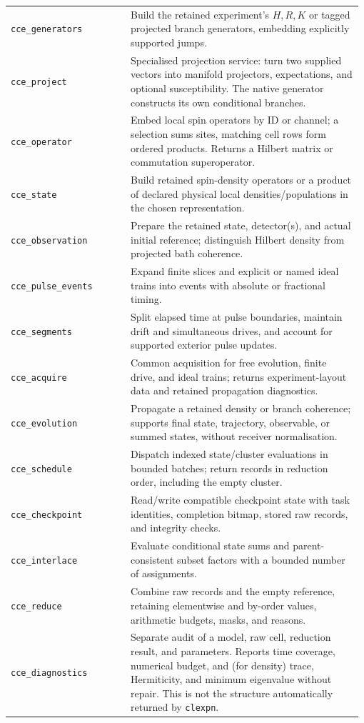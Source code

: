 \documentclass[11pt,a4paper]{article}
\newcommand{\code}[1]{\texttt{#1}}
\begin{document}
\begin{longtable}{@{}>{\raggedright\arraybackslash}p{0.335\linewidth}@{\hspace{0.025\linewidth}}>{\raggedright\arraybackslash}p{0.64\linewidth}@{}}
\code{cce\_generators} & Build the retained experiment's $H,R,K$ or tagged projected branch generators, embedding explicitly supported jumps.\\
\code{cce\_project} & Specialised projection service: turn two supplied vectors into manifold projectors, expectations, and optional susceptibility. The native generator constructs its own conditional branches.\\
\code{cce\_operator} & Embed local spin operators by ID or channel; a selection sums sites, matching cell rows form ordered products. Returns a Hilbert matrix or commutation superoperator.\\
\code{cce\_state} & Build retained spin-density operators or a product of declared physical local densities/populations in the chosen representation.\\
\code{cce\_observation} & Prepare the retained state, detector(s), and actual initial reference; distinguish Hilbert density from projected bath coherence.\\
\code{cce\_pulse\_events} & Expand finite slices and explicit or named ideal trains into events with absolute or fractional timing.\\
\code{cce\_segments} & Split elapsed time at pulse boundaries, maintain drift and simultaneous drives, and account for supported exterior pulse updates.\\
\code{cce\_acquire} & Common acquisition for free evolution, finite drive, and ideal trains; returns experiment-layout data and retained propagation diagnostics.\\
\code{cce\_evolution} & Propagate a retained density or branch coherence; supports final state, trajectory, observable, or summed states, without receiver normalisation.\\
\code{cce\_schedule} & Dispatch indexed state/cluster evaluations in bounded batches; return records in reduction order, including the empty cluster.\\
\code{cce\_checkpoint} & Read/write compatible checkpoint state with task identities, completion bitmap, stored raw records, and integrity checks.\\
\code{cce\_interlace} & Evaluate conditional state sums and parent-consistent subset factors with a bounded number of assignments.\\
\code{cce\_reduce} & Combine raw records and the empty reference, retaining elementwise and by-order values, arithmetic budgets, masks, and reasons.\\
\code{cce\_diagnostics} & Separate audit of a model, raw cell, reduction result, and parameters. Reports time coverage, numerical budget, and (for density) trace, Hermiticity, and minimum eigenvalue without repair. This is not the structure automatically returned by \code{clexpn}.\\
\end{longtable}
\endgroup
\end{document}
